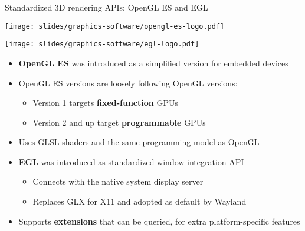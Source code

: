 \begin{frame}[t]{Standardized 3D rendering APIs: OpenGL ES and EGL}
  \begin{minipage}[t]{0.49\textwidth}
    \centering
    \texttt{[image: slides/graphics-software/opengl-es-logo.pdf]}
  \end{minipage}
  \hfill
  \begin{minipage}[t]{0.49\textwidth}
    \centering
    \texttt{[image: slides/graphics-software/egl-logo.pdf]}
  \end{minipage}
  \vspace{0.5em}
  \begin{itemize}
  \item \textbf{OpenGL ES} was introduced as a simplified version for embedded devices
  \item OpenGL ES versions are loosely following OpenGL versions:
    \begin{itemize}
    \item Version 1 targets \textbf{fixed-function} GPUs
    \item Version 2 and up target \textbf{programmable} GPUs
    \end{itemize}
  \item Uses GLSL shaders and the same programming model as OpenGL
  \item \textbf{EGL} was introduced as standardized window integration API
    \begin{itemize}
    \item Connects with the native system display server
    \item Replaces GLX for X11 and adopted as default by Wayland
    \end{itemize}
  \item Supports \textbf{extensions} that can be queried, for extra platform-specific features
  \end{itemize}
\end{frame}

